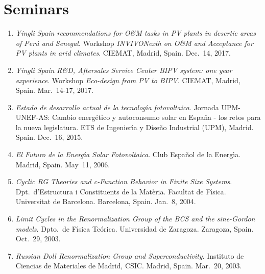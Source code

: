 \documentclass{article}
\begin{document}

\newpage


\section*{Seminars}

\begin{enumerate}
\item
{\it Yingli Spain recommendations for O\&M tasks in PV plants in desertic areas of Per\'u and Senegal}. 
Workshop {\it INVIVONexth on O\&M and Acceptance for PV plants in arid climates}.
CIEMAT, Madrid, Spain.
Dec.~14, 2017.

\item
{\it Yingli Spain R\&D, Aftersales Service Center BIPV system: one year experience}. 
Workshop {\it Eco-design from PV to BIPV}.
CIEMAT, Madrid, Spain.
Mar.~14-17, 2017.

\item
{\it Estado de desarrollo actual de la tecnolog{\'\i}a fotovoltaica}. 
Jornada UPM-UNEF-AS: Cambio energ\'etico y autoconsumo solar en Espa\~na - los retos para la nueva legislatura.
ETS de Ingenier{\'\i}a y Dise\~no Industrial (UPM), Madrid. Spain.
Dec.~16, 2015.

\item
{\it El Futuro de la Energ{\'\i}a Solar Fotovoltaica}.
Club Espa\~nol de la Energ{\'\i}a.
Madrid, Spain.
May~11, 2006. 

\item
{\it Cyclic RG Theories and c-Function Behavior in Finite Size Systems}.
Dpt.~d'Estruc\-tura i Constituents de la Mat\`eria.
Facultat de F\'{\i}sica. Universitat de Barcelona.
Barcelona, Spain.
Jan.~8, 2004.

\item
{\it Limit Cycles in the Renormalization Group of the BCS and the sine-Gordon models}. 
Dpto.\ de F\'{\i}sica Te\'orica. Universidad de Zaragoza.
Zaragoza, Spain.
Oct.~29, 2003.

\item
{\it Russian Doll Renormalization Group and Superconductivity}. 
Instituto de Ciencias de Materiales de Madrid, CSIC. 
Madrid, Spain.
Mar.~20, 2003.


\end{enumerate}
\end{document}
